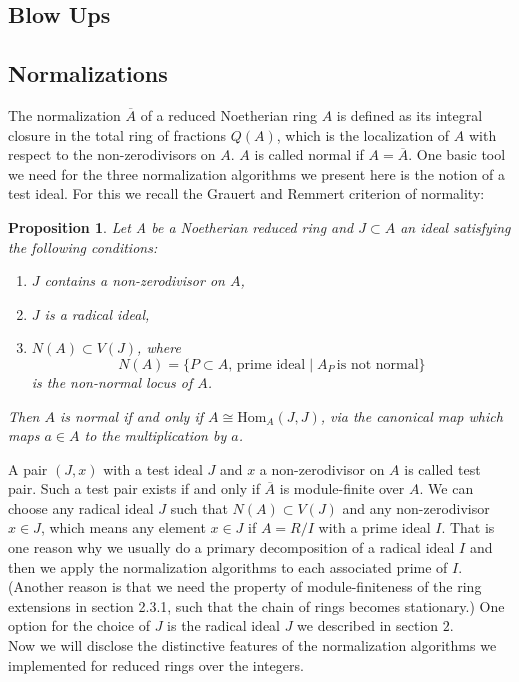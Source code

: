 \documentclass{article}
\newtheorem{prop}[thm]{Proposition}
\begin{document}
\subsection{Blow Ups}


\subsection{Normalizations}
The normalization $\overline{A}$ of a reduced Noetherian ring $A$ is defined 
as its integral closure in the total ring of fractions $Q(A)$, which is the 
localization of $A$ with respect to the non-zerodivisors on $A$. 
$A$ is called normal if $A = \overline{A}$. One basic tool we need for the three 
normalization algorithms we present here is the notion of a test ideal. 
For this we recall the Grauert and Remmert criterion of normality:

\begin{prop}
Let A be a Noetherian reduced ring and $J\subset A$ an ideal satisfying the
following conditions:
\begin{enumerate}
\item[(1)] $J$ contains a non-zerodivisor on $A$,
\item[(2)] $J$ is a radical ideal,
\item[(3)] $N(A)\subset V(J)$, where
$$N(A) = \{P \subset A,\,\text{prime ideal} \mid A_P \,\text{is not normal}\}$$
is the non-normal locus of $A$.
\end{enumerate}
Then $A$ is normal if and only if $A \cong \text{Hom}_A(J,J)$, via the canonical map which 
maps $a \in A$ to the multiplication by $a$.
\end{prop}

\noindent
A pair $(J,x)$ with  a test ideal $J$ and $x$ a non-zerodivisor on $A$ is 
called test pair.
Such a test pair exists if and only if $\overline{A}$ is module-finite over $A$. 
We can choose any radical ideal $J$ such that $N(A)\subset V(J)$ and any 
non-zerodivisor $x\in J$, which means any element $x\in J$ if $A=R/I$ with a prime 
ideal $I$. That is one reason why we usually do a primary decomposition of a radical 
ideal $I$ and then we apply the normalization algorithms to each associated prime 
of $I$. (Another reason is that we need the pro\-perty of module-finiteness of 
the ring extensions in section 2.3.1, such that the chain of rings  becomes 
stationary.)
One option for the choice of $J$ is the radical ideal $J$ we described 
in section $2$.\\
Now we will disclose the distinctive features of the normalization 
algorithms we implemented for reduced rings over the integers.
\end{document}
